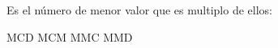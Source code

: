 
\question Es el número de menor valor que es multiplo de ellos:

  \begin{oneparchoices}
    \choice MCD
    \CorrectChoice MCM
    \choice MMC
    \choice MMD
  \end{oneparchoices}
